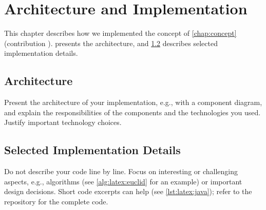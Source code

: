 \chapter{Architecture and Implementation}\label{chap:implementation}

This chapter describes how we implemented the concept of \cref{chap:concept} (contribution ).
 presents the architecture, and \cref{sec:implementation:details} describes selected implementation details.

\section{Architecture}\label{sec:implementation:architecture}

Present the architecture of your implementation, e.g., with a component diagram, and explain the responsibilities of the components and the technologies you used.
Justify important technology choices.

\section{Selected Implementation Details}\label{sec:implementation:details}

Do not describe your code line by line.
Focus on interesting or challenging aspects, e.g., algorithms (see \cref{alg:latex:euclid} for an example) or important design decisions.
Short code excerpts can help (see \cref{lst:latex:java}); refer to the repository for the complete code.
